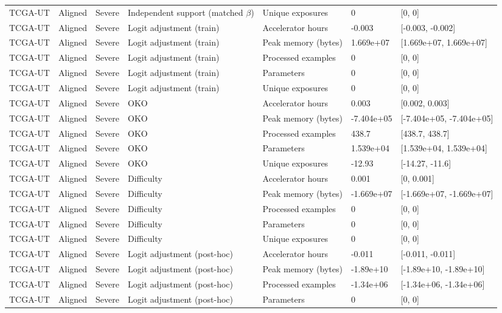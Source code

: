 \begin{longtable}{lllllll}
TCGA-UT & Aligned & Severe & Independent support (matched $\beta$) & Unique exposures & 0 & [0, 0] \\
TCGA-UT & Aligned & Severe & Logit adjustment (train) & Accelerator hours & -0.003 & [-0.003, -0.002] \\
TCGA-UT & Aligned & Severe & Logit adjustment (train) & Peak memory (bytes) & 1.669e+07 & [1.669e+07, 1.669e+07] \\
TCGA-UT & Aligned & Severe & Logit adjustment (train) & Processed examples & 0 & [0, 0] \\
TCGA-UT & Aligned & Severe & Logit adjustment (train) & Parameters & 0 & [0, 0] \\
TCGA-UT & Aligned & Severe & Logit adjustment (train) & Unique exposures & 0 & [0, 0] \\
TCGA-UT & Aligned & Severe & OKO & Accelerator hours & 0.003 & [0.002, 0.003] \\
TCGA-UT & Aligned & Severe & OKO & Peak memory (bytes) & -7.404e+05 & [-7.404e+05, -7.404e+05] \\
TCGA-UT & Aligned & Severe & OKO & Processed examples & 438.7 & [438.7, 438.7] \\
TCGA-UT & Aligned & Severe & OKO & Parameters & 1.539e+04 & [1.539e+04, 1.539e+04] \\
TCGA-UT & Aligned & Severe & OKO & Unique exposures & -12.93 & [-14.27, -11.6] \\
TCGA-UT & Aligned & Severe & Difficulty & Accelerator hours & 0.001 & [0, 0.001] \\
TCGA-UT & Aligned & Severe & Difficulty & Peak memory (bytes) & -1.669e+07 & [-1.669e+07, -1.669e+07] \\
TCGA-UT & Aligned & Severe & Difficulty & Processed examples & 0 & [0, 0] \\
TCGA-UT & Aligned & Severe & Difficulty & Parameters & 0 & [0, 0] \\
TCGA-UT & Aligned & Severe & Difficulty & Unique exposures & 0 & [0, 0] \\
TCGA-UT & Aligned & Severe & Logit adjustment (post-hoc) & Accelerator hours & -0.011 & [-0.011, -0.011] \\
TCGA-UT & Aligned & Severe & Logit adjustment (post-hoc) & Peak memory (bytes) & -1.89e+10 & [-1.89e+10, -1.89e+10] \\
TCGA-UT & Aligned & Severe & Logit adjustment (post-hoc) & Processed examples & -1.34e+06 & [-1.34e+06, -1.34e+06] \\
TCGA-UT & Aligned & Severe & Logit adjustment (post-hoc) & Parameters & 0 & [0, 0] \\

\end{longtable}
